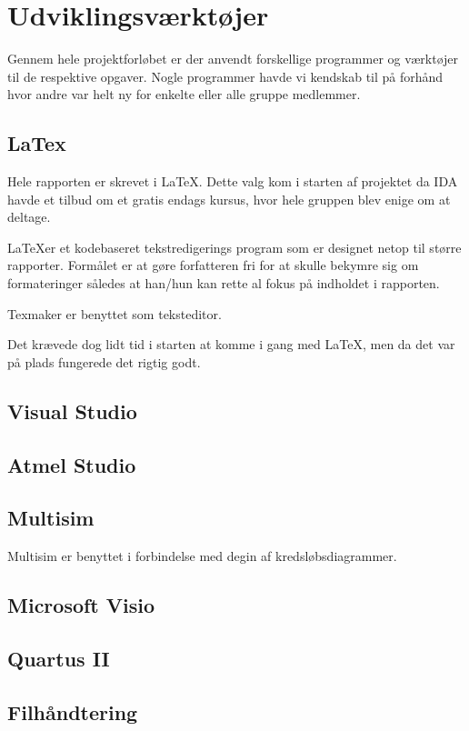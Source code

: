 \chapter{Udviklingsværktøjer}
Gennem hele projektforløbet er der anvendt forskellige programmer og værktøjer til de respektive opgaver. Nogle programmer havde vi kendskab til på forhånd hvor andre var helt ny for enkelte eller alle gruppe medlemmer.

\section{LaTex}
Hele rapporten er skrevet i \LaTeX. Dette valg kom i starten af projektet da IDA havde et tilbud om et gratis endags kursus, hvor hele gruppen blev enige om at deltage. 

\LaTeX er et kodebaseret tekstredigerings program som er designet netop til større rapporter. Formålet er at gøre forfatteren fri for at skulle bekymre sig om formateringer således at han/hun kan rette al fokus på indholdet i rapporten.

Texmaker er benyttet som teksteditor.

Det krævede dog lidt tid i starten at komme i gang med \LaTeX, men da det var på plads fungerede det rigtig godt. 

\section{Visual Studio}

\section{Atmel Studio}

\section{Multisim}
Multisim er benyttet i forbindelse med degin af kredsløbsdiagrammer. 

\section{Microsoft Visio} %

\section{Quartus II}

\section{Filhåndtering}

